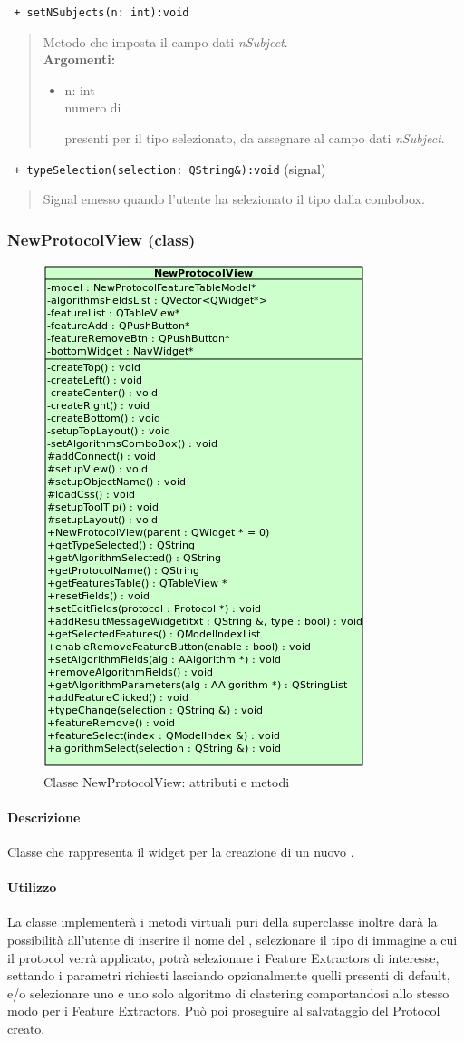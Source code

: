 \color{blue}\verb! + setNSubjects(n: int):void!
\color{black} 
\begin{quote}Metodo che imposta il campo dati \emph{nSubject}. \\
\textbf{Argomenti:}
 \begin{itemize}
 \item n: int \\numero di\subject{} presenti per il tipo selezionato, da assegnare al campo dati \emph{nSubject}.
 \end{itemize}
\end{quote}
\color{blue}\verb! + typeSelection(selection: QString&):void! (signal)
\color{black} 
\begin{quote}
Signal\g{} emesso quando l'utente ha selezionato il tipo dalla combobox.
\end{quote}
\color{black}
\pagebreak
\subsubsection{NewProtocolView (class)}
\label{speNproV}
\begin{figure}[!h]
\centering
			\includegraphics[width=0.4\linewidth]{./Content/Immagini/view/NewProtocolView.png}
			\caption{Classe NewProtocolView: attributi e metodi}
			\label{cl_nsproview}
\end{figure}
\paragraph{Descrizione \\}
Classe che rappresenta il widget per la creazione di un nuovo \protocol{}.
\paragraph{Utilizzo\\}
La classe implementerà i metodi virtuali puri della superclasse inoltre darà la possibilità all'utente di inserire il nome del \protocol{}, selezionare il tipo di immagine a cui il protocol\g{} verrà applicato, potrà selezionare i Feature Extractors\g{} di interesse, settando i parametri richiesti lasciando opzionalmente quelli presenti di default, e/o selezionare uno e uno solo algoritmo di clastering\g{} comportandosi allo stesso modo per i Feature Extractors\g{}. Può poi proseguire al salvataggio del Protocol\g{} creato.
